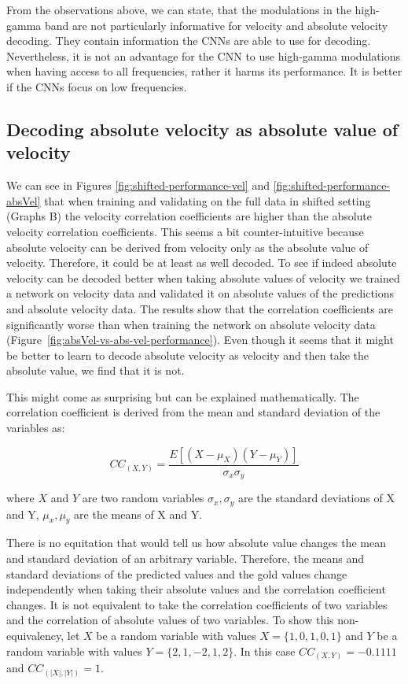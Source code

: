 From the observations above, we can state, that the modulations in the high-gamma band are not particularly informative for velocity and absolute velocity decoding.
They contain information the CNNs are able to use for decoding. 
Nevertheless, it is not an advantage for the CNN to use high-gamma modulations when having access to all frequencies, rather it harms its performance.
It is better if the CNNs focus on low frequencies.

\subsection{Decoding absolute velocity as absolute value of velocity}
We can see in Figures \ref{fig:shifted-performance-vel} and \ref{fig:shifted-performance-absVel} that when training and validating on the full data in shifted setting (Graphs B) the velocity correlation coefficients are higher than the absolute velocity correlation coefficients. 
This seems a bit counter-intuitive because absolute velocity can be derived from velocity only as the absolute value of velocity. 
Therefore, it could be at least as well decoded.
To see if indeed absolute velocity can be decoded better when taking absolute values of velocity we trained a network on velocity data and validated it on absolute values of the predictions and absolute velocity data.
The results show that the correlation coefficients are significantly worse than when training the network on absolute velocity data (Figure~\ref{fig:absVel-vs-abs-vel-performance}). Even though it seems that it might be better to learn to decode absolute velocity as velocity and then take the absolute value, we find that it is not. 

This might come as surprising but can be explained mathematically. The correlation coefficient is derived from the mean and standard deviation of the variables as:

\begin{equation}
    CC_{(X, Y)}= \frac{E[(X - \mu_X)(Y - \mu_Y)] }{\sigma_x \sigma_y}
    \label{eq:correlation}
\end{equation}

where $X$ and $Y$ are two random variables $\sigma_x, \sigma_y$ are the standard deviations of X and Y, $ \mu_x, \mu_y$ are the means of X and Y.

There is no equitation that would tell us how absolute value changes the mean and standard deviation of an arbitrary variable. Therefore, the means and standard deviations of the predicted values and the gold values change independently when taking their absolute values and the correlation coefficient changes.
It is not equivalent to take the correlation coefficients of two variables and the correlation of absolute values of two variables. 
To show this non-equivalency, let $X$ be a random variable with values $X = \{1, 0, 1, 0, 1\} $ and $Y$ be a random variable with values $Y = \{2, 1, -2, 1, 2\}$. In this case $CC_{(X,Y)} = -0.1111$ and $CC_{(|X|,|Y|)} = 1$.

